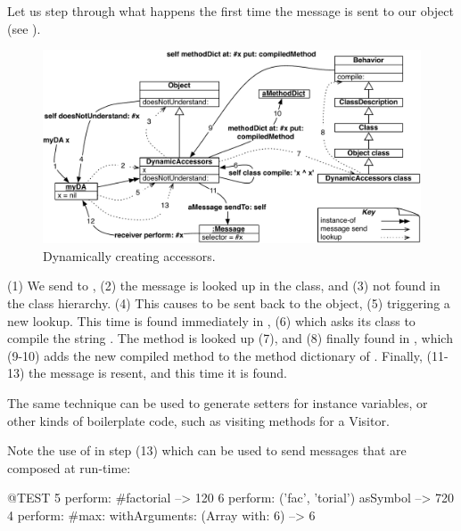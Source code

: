 \documentclass[a4paper,10pt,twoside]{book}
\begin{document}
{Let us step through what happens the first time the message  is sent to our object (see ).

\begin{figure}[ht]\centering
	\includegraphics[width=\linewidth]{DynamicAccessors}
	\caption{Dynamically creating accessors.}
\end{figure}

(1) We send  to , (2) the message is looked up in the class, and (3) not found in the class hierarchy. (4) This causes  to be sent back to the object, (5) triggering a new lookup. This time  is found immediately in , (6) which asks its class to compile the string . The  method is looked up (7), and (8) finally found in , which (9-10) adds the new compiled method to the method dictionary of . Finally, (11-13) the message is resent, and this time it is found.

The same technique can be used to generate setters for instance variables, or other kinds of boilerplate code, such as visiting methods for a Visitor.

Note the use of  in step (13) which can be used to send messages that are composed at run-time:
\begin{code}{@TEST}
5 perform: #factorial                                             --> 120
6 perform: ('fac', 'torial') asSymbol                       --> 720
4 perform: #max: withArguments: (Array with: 6) --> 6
\end{code}

}
\end{document}
